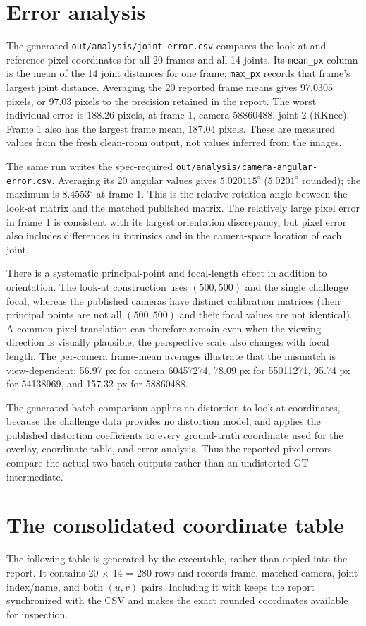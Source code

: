 \documentclass[11pt]{article}
\begin{document}
\section{Error analysis}
The generated \texttt{out/analysis/joint-error.csv} compares the look-at and
reference pixel coordinates for all 20 frames and all 14 joints.  Its
\texttt{mean\_px} column is the mean of the 14 joint distances for one frame;
\texttt{max\_px} records that frame's largest joint distance.  Averaging the
20 reported frame means gives $97.0305$ pixels, or $97.03$ pixels to the
precision retained in the report.  The worst individual error is $188.26$
pixels, at frame 1, camera 58860488, joint 2 (RKnee).  Frame 1 also has the
largest frame mean, $187.04$ pixels.  These are measured values from the fresh
clean-room output, not values inferred from the images.

The same run writes the spec-required
\texttt{out/analysis/camera-angular-error.csv}.  Averaging its 20 angular
values gives $5.020115^\circ$ ($5.0201^\circ$ rounded); the maximum is
$8.4553^\circ$ at frame 1.  This is the relative rotation angle between the
look-at matrix and the matched published matrix.  The relatively large pixel
error in frame 1 is consistent with its largest orientation discrepancy, but
pixel error also includes differences in intrinsics and in the camera-space
location of each joint.

There is a systematic principal-point and focal-length effect in addition to
orientation.  The look-at construction uses $(500,500)$ and the single
challenge focal, whereas the published cameras have distinct calibration
matrices (their principal points are not all $(500,500)$ and their focal
values are not identical).  A common pixel translation can therefore remain
even when the viewing direction is visually plausible; the perspective scale
also changes with focal length.  The per-camera frame-mean averages illustrate
that the mismatch is view-dependent: 56.97 px for camera 60457274, 78.09 px
for 55011271, 95.74 px for 54138969, and 157.32 px for 58860488.

The generated batch comparison applies no distortion to look-at coordinates,
because the challenge data provides no distortion model, and applies the
published distortion coefficients to every ground-truth coordinate used for
the overlay, coordinate table, and error analysis.  Thus the reported pixel
errors compare the actual two batch outputs rather than an undistorted GT
intermediate.

\section{The consolidated coordinate table}
The following table is generated by the executable, rather than copied into
the report.  It contains 20 $\times$ 14 = 280 rows and records frame, matched
camera, joint index/name, and both $(u,v)$ pairs.  Including it with
\verb|| keeps the report synchronized with the CSV and makes the exact
rounded coordinates available for inspection.
\end{document}
